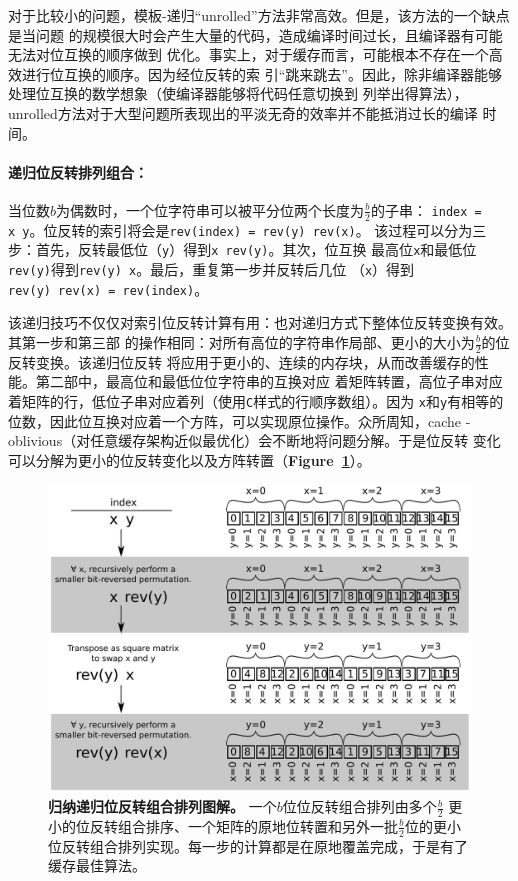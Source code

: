 \documentclass[10pt]{article}
\begin{document}
\begin{CJK*}{UTF8}{gbsn}
对于比较小的问题，模板-递归“unrolled”方法非常高效。但是，该方法的一个缺点是当问题
的规模很大时会产生大量的代码，造成编译时间过长，且编译器有可能无法对位互换的顺序做到
优化。事实上，对于缓存而言，可能根本不存在一个高效进行位互换的顺序。因为经位反转的索
引“跳来跳去”。因此，除非编译器能够处理位互换的数学想象（使编译器能够将代码任意切换到
列举出得算法），unrolled方法对于大型问题所表现出的平淡无奇的效率并不能抵消过长的编译
时间。

\paragraph{递归位反转排列组合：}

当位数$b$为偶数时，一个位字符串可以被平分位两个长度为$\frac{b}{2}$的子串：
{\tt index = x~y}。位反转的索引将会是{\tt rev(index)~=~rev(y)~rev(x)}。
该过程可以分为三步：首先，反转最低位（{\tt y}）得到{\tt x~rev(y)}。其次，位互换
最高位{\tt x}和最低位{\tt rev(y)}得到{\tt rev(y)~x}。最后，重复第一步并反转后几位
（{\tt x}）得到{\tt rev(y)~rev(x)~=~rev(index)}。

该递归技巧不仅仅对索引位反转计算有用：也对递归方式下整体位反转变换有效。其第一步和第三部
的操作相同：对所有高位的字符串作局部、更小的大小为$\frac{b}{2}$的位反转变换。该递归位反转
将应用于更小的、连续的内存块，从而改善缓存的性能。第二部中，最高位和最低位位字符串的互换对应
着矩阵转置，高位子串对应着矩阵的行，低位子串对应着列（使用{\tt C}样式的行顺序数组）。因为
{\tt x}和{\tt y}有相等的位数，因此位互换对应着一个方阵，可以实现原位操作。众所周知，cache
-oblivious（对任意缓存架构近似最优化）会不断地将问题分解\cite{prokop:cache}。于是位反转
变化可以分解为更小的位反转变化以及方阵转置（{\bf Figure~\ref{figure:recursive}}）。

\begin{figure}
\centering
\includegraphics[width=5in]{cartoons/recursive.pdf}
\caption{{\bf 归纳递归位反转组合排列图解。} 一个$b$位位反转组合排列由多个$\frac{b}{2}$
  更小的位反转组合排序、一个矩阵的原地位转置和另外一批$\frac{b}{2}$位的更小位反转组合排列实现。每一步的计算都是在原地覆盖完成，于是有了缓存最佳算法。
  \label{figure:recursive}}
\end{figure}


\end{CJK*}
\end{document}
